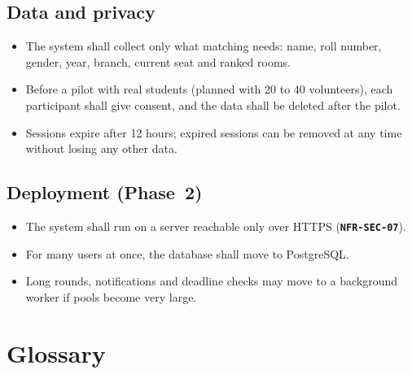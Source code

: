 \documentclass[11pt,a4paper,parskip=half,toc=listof]{scrreprt}
\newcommand{\Req}[1]{\textbf{\texttt{#1}}}
\begin{document}
\section{Data and privacy}

\begin{itemize}
  \item The system shall collect only what matching needs: name, roll
    number, gender, year, branch, current seat and ranked rooms.
  \item Before a pilot with real students (planned with 20 to 40
    volunteers), each participant shall give consent, and the data shall
    be deleted after the pilot.
  \item Sessions expire after 12 hours; expired sessions can be removed at
    any time without losing any other data.
\end{itemize}

\section{Deployment (Phase~2)}

\begin{itemize}
  \item The system shall run on a server reachable only over HTTPS
    (\Req{NFR-SEC-07}).
  \item For many users at once, the database shall move to PostgreSQL.
  \item Long rounds, notifications and deadline checks may move to a
    background worker if pools become very large.
\end{itemize}

\appendix

\chapter{Glossary}\label{app:glossary}
\end{document}
